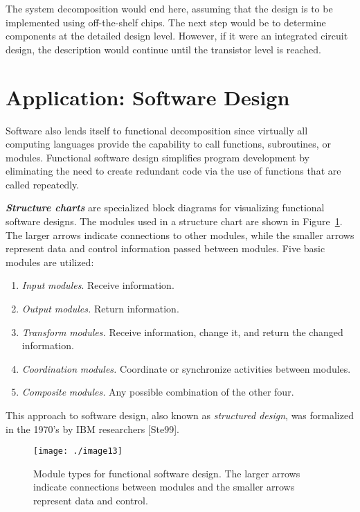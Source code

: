 The system decomposition would end here, assuming that the design is to
be implemented using off-the-shelf chips. The next step would be to
determine components at the detailed design level. However, if it were
an integrated circuit design, the description would continue until the
transistor level is reached.

\section{Application: Software Design}
\label{section:application-software-design}

Software also lends itself to functional decomposition since virtually
all computing languages provide the capability to call functions,
subroutines, or modules. Functional software design simplifies program
development by eliminating the need to create redundant code via the use
of functions that are called repeatedly.

\emph{\textbf{Structure charts}} are specialized block diagrams for
visualizing functional software designs. The modules used in a structure
chart are shown in 
Figure~\ref{figure:softwareModules}. The larger arrows indicate connections to
other modules, while the smaller arrows represent data and control
information passed between modules. Five basic modules are utilized:

\begin{enumerate}
\def\labelenumi{\arabic{enumi}.}
\item
  \emph{Input} \emph{modules}. Receive information.
\item
  \emph{Output} \emph{modules.} Return information.
\item
  \emph{Transform} \emph{modules.} Receive information, change it, and
  return the changed information.
\item
  \emph{Coordination} \emph{modules.} Coordinate or synchronize
  activities between modules.
\item
  \emph{Composite} \emph{modules.} Any possible combination of the other
  four.
\end{enumerate}

This approach to software design, also known as \emph{structured
design}, was formalized in the 1970's by IBM researchers {[}Ste99{]}.

\begin{figure}
\texttt{[image: ./image13]}
\caption{Module types for functional software design. The
larger arrows indicate connections between modules and the smaller
arrows represent data and control.}
\label{figure:softwareModules}
\end{figure}

